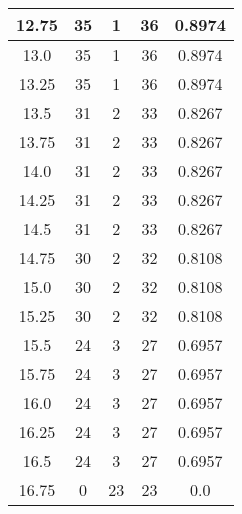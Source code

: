 \documentclass[letterpaper, 12pt]{article}
\begin{document}
\begin{longtable}{|c|c|c|c|c|}
\hline
12.75 & 35 & 1 & 36 & 0.8974 \\
\hline
13.0 & 35 & 1 & 36 & 0.8974 \\
\hline
13.25 & 35 & 1 & 36 & 0.8974 \\
\hline
13.5 & 31 & 2 & 33 & 0.8267 \\
\hline
13.75 & 31 & 2 & 33 & 0.8267 \\
\hline
14.0 & 31 & 2 & 33 & 0.8267 \\
\hline
14.25 & 31 & 2 & 33 & 0.8267 \\
\hline
14.5 & 31 & 2 & 33 & 0.8267 \\
\hline
14.75 & 30 & 2 & 32 & 0.8108 \\
\hline
15.0 & 30 & 2 & 32 & 0.8108 \\
\hline
15.25 & 30 & 2 & 32 & 0.8108 \\
\hline
15.5 & 24 & 3 & 27 & 0.6957 \\
\hline
15.75 & 24 & 3 & 27 & 0.6957 \\
\hline
16.0 & 24 & 3 & 27 & 0.6957 \\
\hline
16.25 & 24 & 3 & 27 & 0.6957 \\
\hline
16.5 & 24 & 3 & 27 & 0.6957 \\
\hline
16.75 & 0 & 23 & 23 & 0.0 \\
\hline
\end{longtable}
\end{document}
